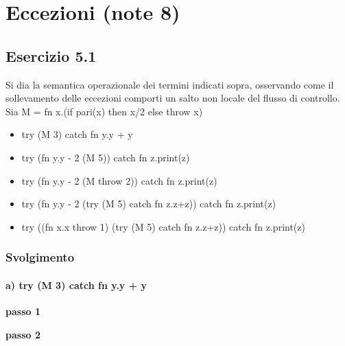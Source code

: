 \section{Eccezioni (note 8)}
\subsection*{Esercizio 5.1}
Si dia la semantica operazionale dei termini indicati sopra, osservando come il sollevamento delle eccezioni comporti un salto non locale del flusso di controllo.
Sia M = fn x.(if pari(x) then x/2 else throw x)
\begin{itemize}
	\item try (M 3) catch fn y.y + y
	\item try (fn y.y - 2 (M 5)) catch fn z.print(z)
	\item try (fn y.y - 2 (M throw 2)) catch fn z.print(z)
	\item try (fn y.y - 2 (try (M 5) catch fn z.z+z)) catch fn z.print(z)
	\item try ((fn x.x throw 1) (try (M 5) catch fn z.z+z)) catch fn z.print(z)
\end{itemize}  

\subsubsection*{Svolgimento} 

\paragraph{a) try (M 3) catch fn y.y + y}\mbox{}

\textbf{passo 1} 
\begin{prooftree} 
\end{prooftree}

\textbf{passo 2} \\		

